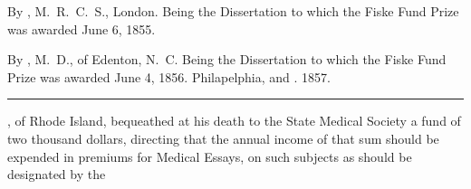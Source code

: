 \footnotesize
{}  By , M.~R.~C.~S., London. Being the Dissertation to which the Fiske Fund Prize was awarded June 6, 1855.

  By , M.~D., of Edenton, N.~C. Being the Dissertation to which the Fiske Fund Prize was awarded June 4, 1856. Philapelphia,  and . 1857.
\plainbreak{1}

\normalsize

, of Rhode Island, bequeathed at his death to the
State Medical Society a fund of two thousand dollars, directing that
the annual income of that sum should be expended in premiums for
Medical Essays, on such subjects as should be designated by the\endinput
